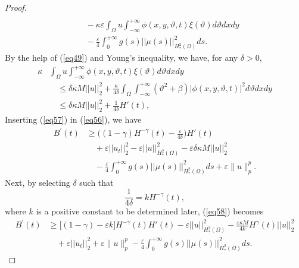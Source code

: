 \documentclass[12pt]{article}
\numberwithin{equation}{section}
\begin{document}
\begin{proof}
\begin{equation}
\begin{split}
\\
&\quad -\kappa\varepsilon  \int_\Omega u \int_{-\infty}^{+\infty}  \phi(x,y,\vartheta,t)\xi (\vartheta) d\vartheta dx dy
\\
&\quad -\frac{\varepsilon}{4} \int_{0}^{+\infty} g(s) ||\mu(s)||^2_{H^2_{*}(\Omega)} ds.
\end{split}
\label{eq56}
\end{equation}
By the help of (\ref{eq49}) and Young's inequality, we have, for any $\delta > 0$,
\begin{equation}
\begin{split}
\kappa
& \int_\Omega u \int_{-\infty}^{+\infty}  \phi(x,y,\vartheta,t)\xi (\vartheta) d\vartheta dx dy
\\
&\quad \leq \delta \kappa M ||u||_2^2 + \frac{\kappa}{4\delta}  \int_\Omega \int_{-\infty}^{+\infty} (\vartheta^2 + \beta) |\phi (x,y,\vartheta,t)|^2 d\vartheta dx dy
\\
&\quad \leq \delta \kappa M ||u||_2^2 + \frac{1}{4\delta} H'(t),
\end{split}
\label{eq57}
\end{equation}
Inserting (\ref{eq57}) in (\ref{eq56}), we have
\begin{equation}
\begin{split}
B^{\prime}(t)
& \geq \biggl( (1-\gamma) H^{-\gamma}(t) - \frac{\varepsilon}{4\delta} \biggl)  H' (t)
\\
&\quad + \varepsilon ||u_t||_2^2 - \varepsilon ||u||^2_{H^2_{*}(\Omega)} - \varepsilon \delta \kappa M ||u||_2^2
\\
&\quad - \frac{\varepsilon}{4} \int_{0}^{+\infty} g(s) ||\mu(s)||^2_{H^2_{*}(\Omega)} ds+\varepsilon\|u\|_{p}^{p}.
\end{split}
\label{eq58}
\end{equation}
Next, by selecting $\delta$ such that
\begin{equation}
    \frac{1}{4\delta} = k H^{-\gamma}(t),
    \label{eq59}
\end{equation}
where $k$ is a positive constant to be determined later, (\ref{eq58}) becomes
\begin{equation}
\begin{split}
B^{\prime}(t)
& \geq \bigr[ (1-\gamma) - \varepsilon k \bigr] H^{-\gamma}(t)H'(t) - \varepsilon ||u||^2_{H^2_{*}(\Omega)} - \frac{\varepsilon \kappa M}{4k} H^{\gamma}(t)||u||_2^2\\
&\quad + \varepsilon ||u_t||_2^2+\varepsilon\|u\|_{p}^{p} - \frac{\varepsilon}{4} \int_{0}^{+\infty} g(s) ||\mu(s)||^2_{H^2_{*}(\Omega)} ds.

\end{split}
\end{equation}
\end{proof}
\end{document}
